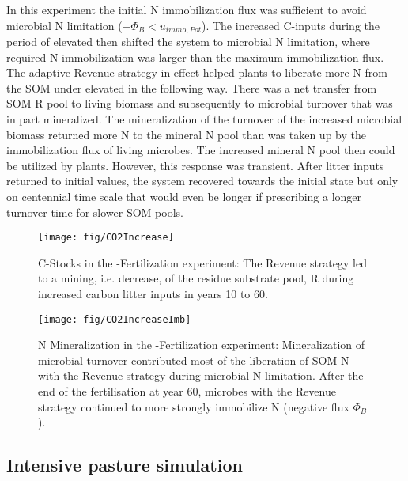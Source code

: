 In this experiment the initial N immobilization flux was sufficient to avoid
microbial N limitation ($-\Phi_B < u_{immo,Pot}$). The increased C-inputs during
the period of elevated  then shifted the system to microbial N
limitation, where required N immobilization was larger than the maximum
immobilization flux.
The adaptive Revenue strategy in effect helped plants to liberate more N from
the SOM under elevated  in the following way. There was a net
transfer from SOM R pool to living biomass and subsequently to microbial
turnover that was in part mineralized. The mineralization of the turnover of the
increased microbial biomass returned more N to the mineral N pool than was taken
up by the immobilization flux of living microbes.
The increased mineral N pool then could be utilized by plants.
However, this response was transient. After litter inputs returned to initial
values, the system recovered towards the initial state but only on centennial
time scale that would even be longer if prescribing a longer turnover time for
slower SOM pools.

\begin{figure}[t] \vspace*{2mm}
\begin{center}
\texttt{[image: fig/CO2Increase]}
\end{center}
\caption{
C-Stocks in the -Fertilization experiment: The Revenue strategy led
to a mining, i.e. decrease, of the residue substrate pool, R during increased carbon
litter inputs in years 10 to 60.
\label{fig:CO2Increase}}

\end{figure}
\begin{figure}[t] \vspace*{2mm}
\begin{center}
\texttt{[image: fig/CO2IncreaseImb]} 
\end{center}
\caption{
N Mineralization in the -Fertilization experiment:
Mineralization of microbial turnover contributed most of the liberation of SOM-N
with the Revenue strategy during microbial N limitation.
After the end of the fertilisation at year 60, microbes with the Revenue
strategy continued to more strongly immobilize N (negative flux $\Phi_B$).
\label{fig:CO2IncreaseImb}}
\end{figure}

\subsection{Intensive pasture simulation}
\label{sec:ResultsPasture}

